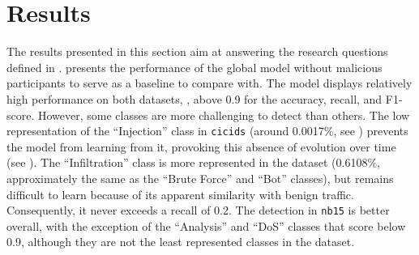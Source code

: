 \section{Results\label{sec:assess.results}}

The results presented in this section aim at answering the research questions defined in .
 presents the performance of the global model without malicious participants to serve as a baseline to compare with.
The model displays relatively high performance on both datasets, \ie, above 0.9 for the accuracy, recall, and F1-score.
However, some classes are more challenging to detect than others.
The low representation of the ``Injection'' class in \texttt{cicids} (around 0.0017\%, see ) prevents the model from learning from it, provoking this absence of evolution over time (see ).
The ``Infiltration'' class is more represented in the dataset (0.6108\%, approximately the same as the ``Brute Force'' and ``Bot'' classes), but remains difficult to learn because of its apparent similarity with benign traffic.
Consequently, it never exceeds a recall of 0.2.
The detection in \texttt{nb15} is better overall, with the exception of the ``Analysis'' and ``DoS'' classes that score below 0.9, although they are not the least represented classes in the dataset.


